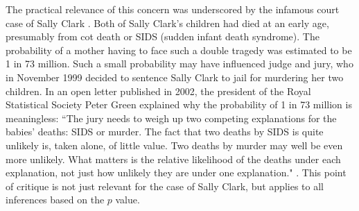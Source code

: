The practical relevance of this concern was underscored by the infamous court case of Sally Clark \cite{Dawid2005,Hill2005,NoblesSchiff2005}. Both of Sally Clark's children had died at an early age, presumably from cot death or SIDS (sudden infant death syndrome). The probability of a mother having to face such a double tragedy was estimated to be 1 in 73 million. Such a small probability may have influenced judge and jury, who in November 1999 decided to sentence Sally Clark to jail for murdering her two children. In an open letter published in 2002, the president of the Royal Statistical Society Peter Green explained why the probability of 1 in 73 million is meaningless: ``The jury needs to weigh up two competing explanations for the babies' deaths: SIDS or murder. The fact that two deaths by SIDS is quite unlikely is, taken alone, of little value. Two deaths by murder may well be even more unlikely. What matters is the relative likelihood of the deaths under each explanation, not just how unlikely they are under one explanation." \cite[p. 19]{NoblesSchiff2005}. This point of critique is not just relevant for the case of Sally Clark, but applies to all inferences based on the $p$ value.

